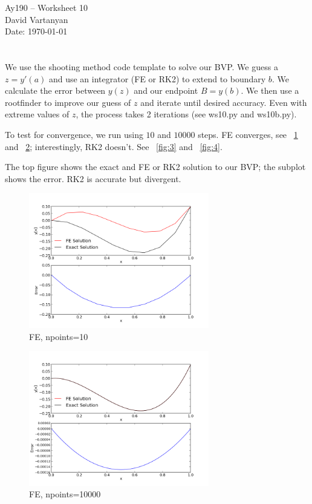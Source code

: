 \documentclass[11pt,letterpaper]{article}
\begin{document}
\begin{center}
\Large
Ay190 -- Worksheet 10\\
David Vartanyan\\
Date: \today
\end{center}

\section{}

We use the shooting method code template to solve our BVP. We guess a $z=y'(a)$ and use an integrator (FE or RK2) to extend to boundary $b$. We calculate the error between $y(z)$ and our endpoint $B=y(b)$. We then use a rootfinder to improve our guess of $z$ and iterate until desired accuracy. Even with extreme values of $z$, the process takes 2 iterations (see ws10.py and ws10b.py).

To test for convergence, we run using $10$ and $10000$ steps. FE converges, see ~\ref{fig:1} and ~\ref{fig:2}; interestingly, RK2 doesn't. See ~\ref{fig:3} and ~\ref{fig:4}.

The top figure shows the exact and FE or RK2 solution to our BVP; the subplot shows the error. RK2 is accurate but divergent.

\begin{figure}[bth]
\centering
\includegraphics[width=0.7\textwidth]{ws101a.png}
\caption{FE, npoints=10}
\label{fig:1}
\end{figure}

\begin{figure}[bth]
\centering
\includegraphics[width=0.7\textwidth]{ws101b.png}
\caption{FE, npoints=10000}
\label{fig:2}
\end{figure}
\end{document}
